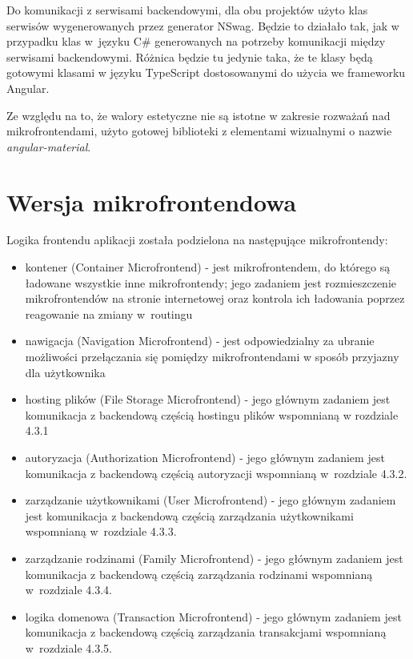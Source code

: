 \documentclass{SGGW-thesis}
\begin{document}
Do komunikacji z serwisami backendowymi, dla obu projektów użyto klas serwisów wygenerowanych przez generator NSwag. Będzie to działało tak, jak w przypadku klas w~języku C\# generowanych na potrzeby komunikacji między serwisami backendowymi. Różnica będzie tu jedynie taka, że te klasy będą gotowymi klasami w języku TypeScript dostosowanymi do użycia we frameworku Angular.

Ze względu na to, że walory estetyczne nie są istotne w zakresie rozważań nad mikrofrontendami, użyto gotowej biblioteki z elementami wizualnymi o nazwie \textit{angular-material}.

  \section{Wersja mikrofrontendowa}
  Logika frontendu aplikacji została podzielona na następujące mikrofrontendy:

  \begin{itemize}
    \item kontener (Container Microfrontend) - jest mikrofrontendem, do którego są ładowane wszystkie inne mikrofrontendy; jego zadaniem jest rozmieszczenie mikrofrontendów na stronie internetowej oraz kontrola ich ładowania poprzez reagowanie na zmiany w~routingu
    \item nawigacja (Navigation Microfrontend) - jest odpowiedzialny za ubranie możliwości przełączania się pomiędzy mikrofrontendami w sposób przyjazny dla użytkownika
    \item hosting plików (File Storage Microfrontend) - jego głównym zadaniem jest komunikacja z backendową częścią hostingu plików wspomnianą w rozdziale 4.3.1
    \item autoryzacja (Authorization Microfrontend) - jego głównym zadaniem jest komunikacja z backendową częścią autoryzacji wspomnianą w~rozdziale 4.3.2.
    \item zarządzanie użytkownikami (User Microfrontend) - jego głównym zadaniem jest komunikacja z backendową częścią zarządzania użytkownikami wspomnianą w~rozdziale 4.3.3.
    \item zarządzanie rodzinami (Family Microfrontend) - jego głównym zadaniem jest komunikacja z backendową częścią zarządzania rodzinami wspomnianą w~rozdziale 4.3.4.
    \item logika domenowa (Transaction Microfrontend) - jego głównym zadaniem jest komunikacja z backendową częścią zarządzania transakcjami wspomnianą w~rozdziale 4.3.5.
  \end{itemize}
\end{document}
